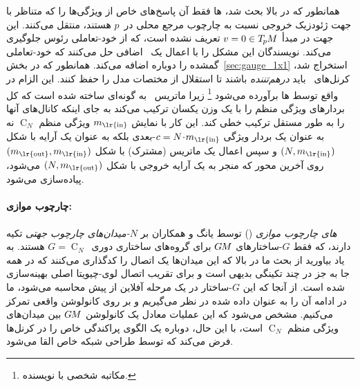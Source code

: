همانطور که در بالا بحث شد، ها فقط آن پاسخ‌های خاص از ویژگی‌ها را که متناظر با جهت ژئودزیک خروجی نسبت به چارچوب مرجع محلی در~$p$ هستند، منتقل می‌کنند.
این جهت در مبدأ $v=0 \in T_{\mkern-1.5mu p}\mkern-.5muM$ تعریف نشده است، که از خود-تعاملی رئوس جلوگیری می‌کند.
نویسندگان این مشکل را با اعمال یک \onexonefarsi\ اضافی حل می‌کنند که خود-تعاملی گمشده را دوباره اضافه می‌کند.
همانطور که در بخش~\ref{sec:gauge_1x1} استخراج شد، کرنل‌های \onexonefarsi\ باید \emph{درهم‌تننده} باشند تا استقلال از مختصات مدل را حفظ کنند.
این الزام در واقع توسط ها برآورده می‌شود%
\footnote{
    مکاتبه شخصی با نویسنده.
}
زیرا ماتریس \onexonefarsi\ به گونه‌ای ساخته شده است که کل بردارهای ویژگی منظم را با یک وزن یکسان ترکیب می‌کند به جای اینکه کانال‌های آنها را به طور مستقل ترکیب خطی کند.
این کار با نمایش $m_\textup{\lr{in}}$ ویژگی منظم $\operatorname{C}_N$ نه به عنوان یک بردار ویژگی ${c=N \!\cdot\! m_\textup{\lr{in}}}$-بعدی بلکه به عنوان یک آرایه با شکل $(N,m_\textup{\lr{in}})$ و سپس اعمال یک ماتریس (مشترک) با شکل $(m_\textup{\lr{out}},m_\textup{\lr{in}})$ روی آخرین محور که منجر به یک آرایه خروجی با شکل $(N,m_\textup{\lr{out}})$ می‌شود، پیاده‌سازی می‌شود.








\paragraph{ چارچوب موازی:}
\emph{های چارچوب موازی} () توسط یانگ و همکاران\cite{Yang2020parallelFrameCNN} بر \emph{$N$-میدان‌های چارچوب جهتی} تکیه دارند، که فقط $G$-ساختارهای $G\mkern-1.4muM$ برای گروه‌های ساختاری دوری~$G=\operatorname{C}_N$ هستند.
به یاد بیاورید از بحث ما در بالا که این میدان‌ها یک اتصال را کدگذاری می‌کنند که در همه جا به جز در چند تکینگی بدیهی است و برای تقریب اتصال لوی-چیویتا اصلی بهینه‌سازی شده است.
از آنجا که این $G$-ساختار در یک مرحله آفلاین از پیش محاسبه می‌شود، ما در ادامه آن را به عنوان داده شده در نظر می‌گیریم و بر روی کانولوشن واقعی  تمرکز می‌کنیم.
مشخص می‌شود که این عملیات معادل یک کانولوشن $G\mkern-1.4muM$ بین میدان‌های ویژگی منظم $\operatorname{C}_N$ است، با این حال، دوباره یک الگوی پراکندگی خاص را در کرنل‌ها فرض می‌کند که توسط طراحی شبکه خاص القا می‌شود.

